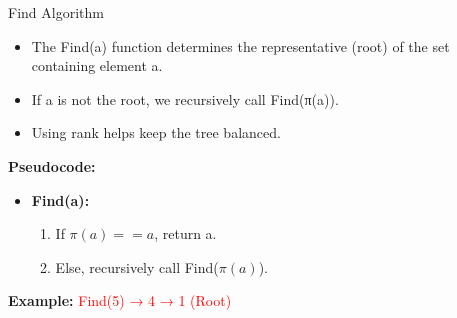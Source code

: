 \begin{frame}{Find Algorithm}
    \begin{itemize}
        \item The Find(a) function determines the representative (root) of the set containing element a.
        \item If a is not the root, we recursively call Find(π(a)).
        \item Using rank helps keep the tree balanced.
    \end{itemize}

    \vspace{0.5cm}
    \textbf{Pseudocode:}
    \begin{itemize}
        \item \textbf{Find(a):}
        \begin{enumerate}
            \item If \( \pi(a) == a \), return a.
            \item Else, recursively call Find(\(\pi(a)\)).
            
        \end{enumerate}
    \end{itemize}

    \vspace{0.3cm}
    \centering

    \vspace{0.3cm}
    \textbf{Example:} \textcolor{red}{Find(5) → 4 → 1 (Root)}

\end{frame}




